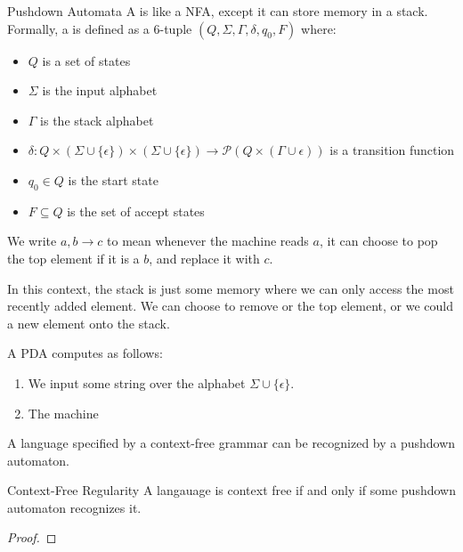\documentclass[math]{amznotes}
\begin{document}
\begin{dfnbox}{Pushdown Automata}{}
    A  is like a NFA, except it can store memory in a stack.
    \tcblower
    Formally, a  is defined as a 6-tuple $(Q, \Sigma, \Gamma, \delta, q_0, F)$ where:
    \begin{itemize}[noitemsep]
        \item $Q$ is a set of states
        \item $\Sigma$ is the input alphabet
        \item $\Gamma$ is the stack alphabet
        \item $\delta : Q \times (\Sigma \cup \{\epsilon\}) \times (\Sigma \cup \{\epsilon\}) \to \mathcal{P}(Q \times (\Gamma \cup \epsilon))$ is a transition function
        \item $q_0 \in Q$ is the start state
        \item $F \subseteq Q$ is the set of accept states
    \end{itemize}
    We write $a,b\to c$ to mean whenever the machine reads $a$, it can choose to pop the top element if it is a $b$, and replace it with $c$.
\end{dfnbox}

In this context, the stack is just some memory where we can only access the most recently added element. We can choose to remove or  the top element, or we could  a new element onto the stack.

A PDA computes as follows:
\begin{enumerate}
    \item We input some string over the alphabet $\Sigma \cup \{\epsilon\}$.
    \item The machine 
\end{enumerate}

A language specified by a context-free grammar can be recognized by a pushdown automaton.
\begin{thmbox}{Context-Free Regularity}{}
    A langauage is context free if and only if some pushdown automaton recognizes it.
    \tcblower
    \begin{proof}

    \end{proof}
\end{thmbox}



\amzindex
\end{document}
